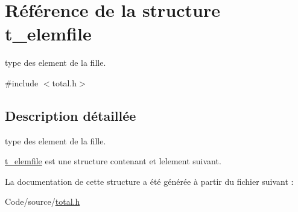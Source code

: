 \hypertarget{structt__elemfile}{}\section{Référence de la structure t\+\_\+elemfile}
\label{structt__elemfile}


type des element de la fille.  




{\ttfamily \#include $<$total.\+h$>$}



\subsection{Description détaillée}
type des element de la fille. 

\hyperlink{structt__elemfile}{t\+\_\+elemfile} est une structure contenant et l\textquotesingle{}element suivant. 

La documentation de cette structure a été générée à partir du fichier suivant \+:\begin{DoxyCompactItemize}
\item 
Code/source/\hyperlink{total_8h}{total.\+h}\end{DoxyCompactItemize}

